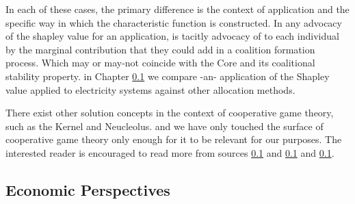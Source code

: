 


In each of these cases, the primary difference is the context of application and the specific way in which the characteristic function is constructed.
In any advocacy of the shapley value for an application, is tacitly advocacy of to each individual by the marginal contribution that they could add in a coalition formation process.
Which may or may-not coincide with the Core and its coalitional stability property.
in Chapter \ref{} we compare -an- application of the Shapley value applied to electricity systems against other allocation methods.

There exist other solution concepts in the context of cooperative game theory, such as the Kernel and Neucleolus. and we have only touched the surface of cooperative game theory only enough for it to be relevant for our purposes.
The interested reader is encouraged to read more from sources \ref{} and \ref{} and \ref{}.

\subsection{Economic Perspectives}

